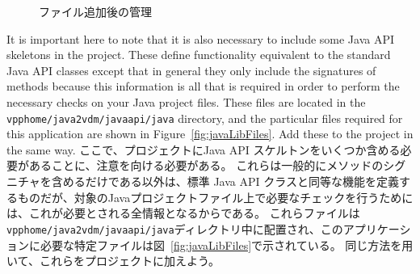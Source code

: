 \documentclass[\pformat,12pt]{jarticle}
\newcommand{\vdmhome}{vpphome}
\begin{document}
\begin{figure}[tbh]
\begin{center}
\caption{ファイル追加後の管理}\label{fig:addedJavaFiles}
\end{center}
\end{figure}

It is important here to note that it is also necessary to include some
Java API skeletons in the project. These define functionality
equivalent to the standard Java API classes except that in general
they only include the signatures of methods because this information
is all that is required in order to perform the necessary checks on
your Java project files. These files are located in the {\tt
  \vdmhome/java2vdm/javaapi/java} directory, and the particular files
required for this application are shown in
Figure~\ref{fig:javaLibFiles}. Add these to the 
project in the same way.
ここで、プロジェクトにJava API スケルトンをいくつか含める必要があることに、注意を向ける必要がある。
これらは一般的にメソッドのシグニチャを含めるだけである以外は、標準 Java API クラスと同等な機能を定義するものだが、対象のJavaプロジェクトファイル上で必要なチェックを行うためには、これが必要とされる全情報となるからである。
これらファイルは {\tt  \vdmhome/java2vdm/javaapi/java}ディレクトリ中に配置され、このアプリケーションに必要な特定ファイルは図~\ref{fig:javaLibFiles}で示されている。 
同じ方法を用いて、これらをプロジェクトに加えよう。
\end{document}
